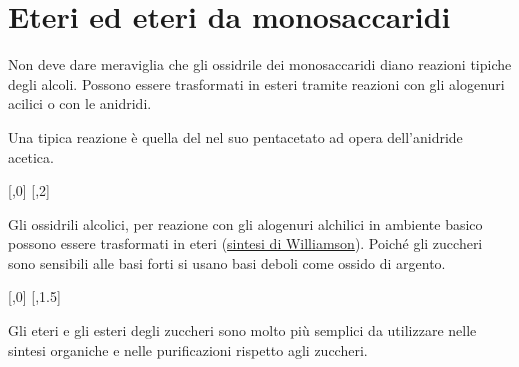 \section{Eteri ed eteri da monosaccaridi}
Non deve dare meraviglia che gli ossidrile dei monosaccaridi diano reazioni tipiche degli alcoli. Possono essere trasformati in esteri tramite reazioni con gli alogenuri acilici o con le anidridi.

Una tipica reazione è quella del  nel suo pentacetato ad opera dell'anidride acetica.

\begin{reaction}
	[,0]
	[,2]
\end{reaction}

Gli ossidrili alcolici, per reazione con gli alogenuri alchilici in ambiente basico possono essere trasformati in eteri (\hyperref[rcn:sintesiWilliamson]{sintesi di Williamson}). Poiché gli zuccheri sono sensibili alle basi forti si usano basi deboli come ossido di argento.

\begin{reaction}
	[,0]
	\arrow{->[\ch{Ag2O}][\ch{CH3I}]}[,1.5]
\end{reaction}

Gli eteri e gli esteri degli zuccheri sono molto più semplici da utilizzare nelle sintesi organiche e nelle purificazioni rispetto agli zuccheri.



